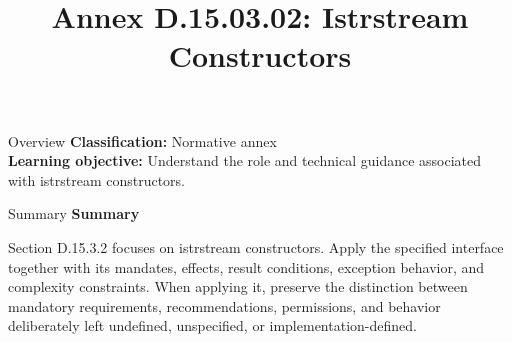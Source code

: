 \documentclass[10pt,letterpaper]{article}
\title{Annex D.15.03.02: Istrstream Constructors}
\author{}
\date{}
\begin{document}
\maketitle
\begin{CornellOverviewBox}{Overview}
\textbf{Classification:} Normative annex\\[2pt]
\textbf{Learning objective:} Understand the role and technical guidance associated with istrstream constructors.
\end{CornellOverviewBox}\begin{CornellSummaryBox}{Summary}
{\sffamily\bfseries\color{Accent} Summary}\par\vspace{3pt}Section D.15.3.2 focuses on istrstream constructors. Apply the specified interface together with its mandates, effects, result conditions, exception behavior, and complexity constraints. When applying it, preserve the distinction between mandatory requirements, recommendations, permissions, and behavior deliberately left undefined, unspecified, or implementation-defined.
\end{CornellSummaryBox}
\end{document}
